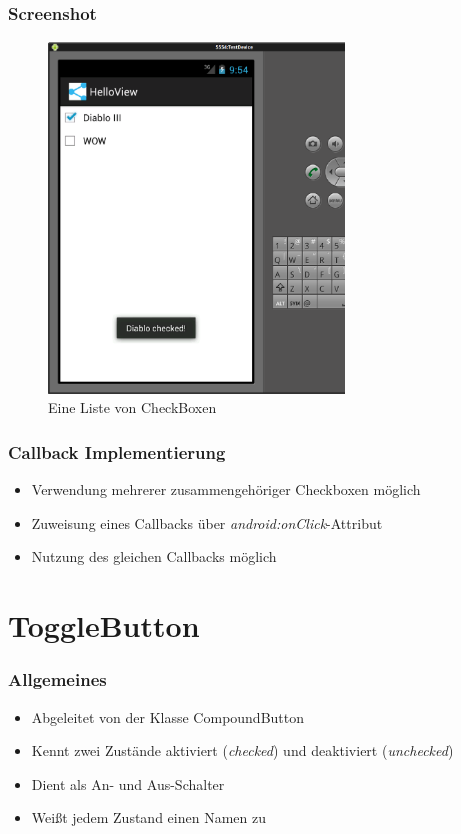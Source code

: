 \begin{frame}
   \frametitle{Screenshot}
	\begin{figure}[h!]
	  \centering
	  \includegraphics[width=0.7\textwidth]{pictures/checkbox.ps}
	  \caption{
		  Eine Liste von CheckBoxen
	  }
	  \label{fig:checkbox}
	\end{figure}
\end{frame}

\begin{frame}
   \frametitle{Callback Implementierung}
   \begin{itemize}
      \item Verwendung mehrerer zusammengehöriger Checkboxen möglich
      \item Zuweisung eines Callbacks über \emph{android:onClick}-Attribut
      \item Nutzung des gleichen Callbacks möglich
   \end{itemize}

	
\end{frame}

\section{ToggleButton}
\begin{frame}
   \frametitle{Allgemeines}
   \begin{itemize}
      \item Abgeleitet von der Klasse CompoundButton
      \item Kennt zwei Zustände aktiviert (\emph{checked}) und deaktiviert (\emph{unchecked})
      \item Dient als An- und Aus-Schalter 
      \item Weißt jedem Zustand einen Namen zu
   \end{itemize}

	
\end{frame}


